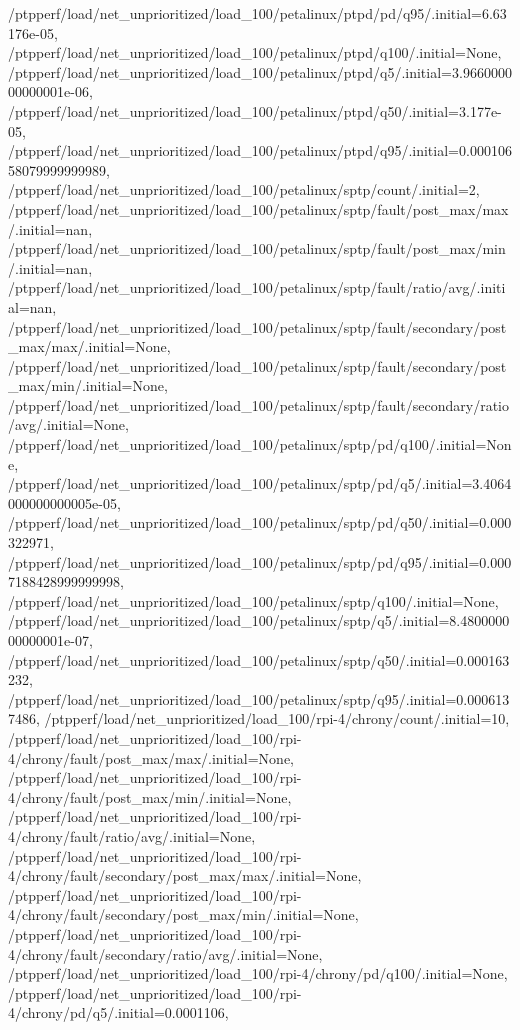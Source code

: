 {    /ptpperf/load/net_unprioritized/load_100/petalinux/ptpd/pd/q95/.initial=6.63176e-05,
    /ptpperf/load/net_unprioritized/load_100/petalinux/ptpd/q100/.initial=None,
    /ptpperf/load/net_unprioritized/load_100/petalinux/ptpd/q5/.initial=3.966000000000001e-06,
    /ptpperf/load/net_unprioritized/load_100/petalinux/ptpd/q50/.initial=3.177e-05,
    /ptpperf/load/net_unprioritized/load_100/petalinux/ptpd/q95/.initial=0.00010658079999999989,
    /ptpperf/load/net_unprioritized/load_100/petalinux/sptp/count/.initial=2,
    /ptpperf/load/net_unprioritized/load_100/petalinux/sptp/fault/post_max/max/.initial=nan,
    /ptpperf/load/net_unprioritized/load_100/petalinux/sptp/fault/post_max/min/.initial=nan,
    /ptpperf/load/net_unprioritized/load_100/petalinux/sptp/fault/ratio/avg/.initial=nan,
    /ptpperf/load/net_unprioritized/load_100/petalinux/sptp/fault/secondary/post_max/max/.initial=None,
    /ptpperf/load/net_unprioritized/load_100/petalinux/sptp/fault/secondary/post_max/min/.initial=None,
    /ptpperf/load/net_unprioritized/load_100/petalinux/sptp/fault/secondary/ratio/avg/.initial=None,
    /ptpperf/load/net_unprioritized/load_100/petalinux/sptp/pd/q100/.initial=None,
    /ptpperf/load/net_unprioritized/load_100/petalinux/sptp/pd/q5/.initial=3.4064000000000005e-05,
    /ptpperf/load/net_unprioritized/load_100/petalinux/sptp/pd/q50/.initial=0.000322971,
    /ptpperf/load/net_unprioritized/load_100/petalinux/sptp/pd/q95/.initial=0.0007188428999999998,
    /ptpperf/load/net_unprioritized/load_100/petalinux/sptp/q100/.initial=None,
    /ptpperf/load/net_unprioritized/load_100/petalinux/sptp/q5/.initial=8.480000000000001e-07,
    /ptpperf/load/net_unprioritized/load_100/petalinux/sptp/q50/.initial=0.000163232,
    /ptpperf/load/net_unprioritized/load_100/petalinux/sptp/q95/.initial=0.0006137486,
    /ptpperf/load/net_unprioritized/load_100/rpi-4/chrony/count/.initial=10,
    /ptpperf/load/net_unprioritized/load_100/rpi-4/chrony/fault/post_max/max/.initial=None,
    /ptpperf/load/net_unprioritized/load_100/rpi-4/chrony/fault/post_max/min/.initial=None,
    /ptpperf/load/net_unprioritized/load_100/rpi-4/chrony/fault/ratio/avg/.initial=None,
    /ptpperf/load/net_unprioritized/load_100/rpi-4/chrony/fault/secondary/post_max/max/.initial=None,
    /ptpperf/load/net_unprioritized/load_100/rpi-4/chrony/fault/secondary/post_max/min/.initial=None,
    /ptpperf/load/net_unprioritized/load_100/rpi-4/chrony/fault/secondary/ratio/avg/.initial=None,
    /ptpperf/load/net_unprioritized/load_100/rpi-4/chrony/pd/q100/.initial=None,
    /ptpperf/load/net_unprioritized/load_100/rpi-4/chrony/pd/q5/.initial=0.0001106,
}

